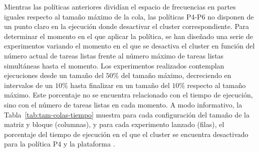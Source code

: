 Mientras las políticas anteriores dividían el espacio de frecuencias en
partes iguales respecto al tamaño máximo de la cola, las políticas P4-P6 no
disponen de un punto claro en la ejecución donde desactivar el cluster
correspondiente. Para determinar el momento en el que aplicar la política,
se han diseñado una serie de experimentos variando el momento en el que se
desactiva el cluster en función del número actual de tareas listas frente
al número máximo de tareas listas simultáneas  hasta el momento. Los
experimentos realizados contemplan ejecuciones desde un tamaño del $50\%$
del tamaño máximo, decreciendo en intervalos de un $10\%$ hasta finalizar
en un tamaño del $10\%$ respecto al tamaño máximo. Este
porcentaje no se encuentra relacionado con el tiempo de ejecución, sino con
el número de tareas listas en cada momento. A modo informativo, la
Tabla~\ref{tab:tam-colas-tiempo} muestra para cada configuración del tamaño
de la matriz y bloque (columnas), y para cada experimento lanzado (filas),
el porcentaje del tiempo de ejecución en el que el cluster se encuentra
desactivado para la política P4 y la plataforma \juno.

